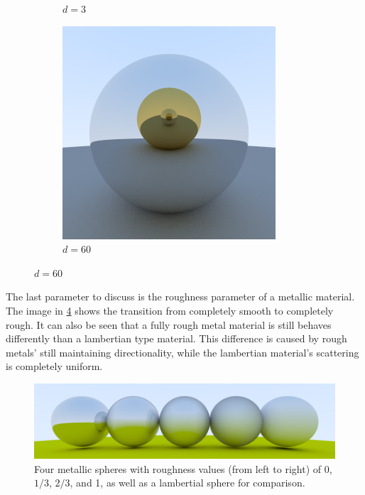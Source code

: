 \documentclass[10pt]{IEEEtran}
\begin{document}
\begin{figure}
\begin{subfigure}[b]{0.2\textwidth}
        \caption{$d=3$}
        \label{fig:recursion d equals 3}
    \end{subfigure}
    \begin{subfigure}[b]{0.2\textwidth}
        \centering
        \includegraphics[width=\textwidth]{images/recursiveDepth/60.png}
        \caption{$d=60$}
        \label{fig:recursion d equals 60}
    \end{subfigure}
\end{figure}

The last parameter to discuss is the roughness parameter of a metallic material. The image in
\cref{fig:roughness} shows the transition from completely smooth to completely rough. It can also be
seen that a fully rough metal material is still behaves differently than a lambertian type material.
This difference is caused by rough metals' still maintaining directionality, while the lambertian
material's scattering is completely uniform.

\begin{figure}

    \caption{ Four metallic spheres with roughness values (from left to right) of 0, $1/3$, $2/3$,
        and 1, as well as a lambertial sphere for comparison.}

    \label{fig:roughness}
    \includegraphics[width=\columnwidth]{images/roughness.png}
\end{figure}
\end{document}
